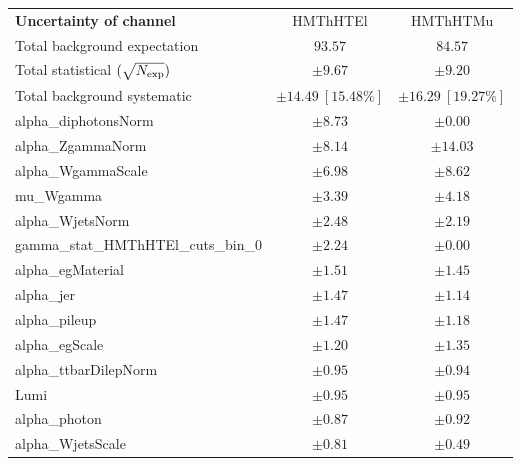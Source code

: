 
\begin{table}
\begin{center}
\setlength{\tabcolsep}{0.0pc}
\begin{tabular*}{\textwidth}{@{\extracolsep{\fill}}lcc}
\noalign{\smallskip}\hline\noalign{\smallskip}
{\bf Uncertainty of channel}                                    & HMThHTEl            & HMThHTMu            \\
\noalign{\smallskip}\hline\noalign{\smallskip}
Total background expectation             &  $93.57$        &  $84.57$       \\
\noalign{\smallskip}\hline\noalign{\smallskip}
Total statistical $(\sqrt{N_{\rm exp}})$              & $\pm 9.67$        & $\pm 9.20$       \\
Total background systematic               & $\pm 14.49\ [15.48\%] $        & $\pm 16.29\ [19.27\%] $             \\
\noalign{\smallskip}\hline\noalign{\smallskip}
\noalign{\smallskip}\hline\noalign{\smallskip}
alpha\_diphotonsNorm         & $\pm 8.73$          & $\pm 0.00$       \\
alpha\_ZgammaNorm         & $\pm 8.14$          & $\pm 14.03$       \\
alpha\_WgammaScale         & $\pm 6.98$          & $\pm 8.62$       \\
mu\_Wgamma         & $\pm 3.39$          & $\pm 4.18$       \\
alpha\_WjetsNorm         & $\pm 2.48$          & $\pm 2.19$       \\
gamma\_stat\_HMThHTEl\_cuts\_bin\_0         & $\pm 2.24$          & $\pm 0.00$       \\
alpha\_egMaterial         & $\pm 1.51$          & $\pm 1.45$       \\
alpha\_jer         & $\pm 1.47$          & $\pm 1.14$       \\
alpha\_pileup         & $\pm 1.47$          & $\pm 1.18$       \\
alpha\_egScale         & $\pm 1.20$          & $\pm 1.35$       \\
alpha\_ttbarDilepNorm         & $\pm 0.95$          & $\pm 0.94$       \\
Lumi         & $\pm 0.95$          & $\pm 0.95$       \\
alpha\_photon         & $\pm 0.87$          & $\pm 0.92$       \\
alpha\_WjetsScale         & $\pm 0.81$          & $\pm 0.49$       \\

\end{tabular*}
\end{center}
\end{table}

